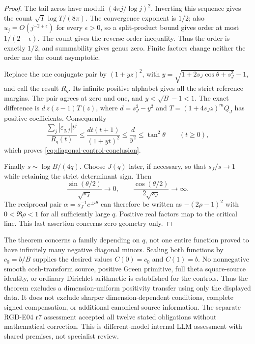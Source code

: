 \begin{proof}
The tail zeros have moduli $(4\pi j/\log j)^2$. Inverting this sequence
gives the count $\sqrt T\log T/(8\pi)$. The convergence exponent is
$1/2$; also $u_j=O(j^{-2+\epsilon})$ for every $\epsilon>0$, so a
split-product bound gives order at most $1/(2-\epsilon)$. The count
gives the reverse order inequality. Thus the order is exactly $1/2$,
and summability gives genus zero. Finite factors change neither the
order nor the count asymptotic.

Replace the one conjugate pair by $(1+yz)^2$, with
$y=\sqrt{1+2s_J\cos\theta+s_J^2}-1$, and call the result $R_q$.
Its infinite positive alphabet gives all the strict reference margins.
The pair agrees at zero and one, and $y<\sqrt B-1<1$.
The exact difference is $d\,z(z-1)T(z)$, where
$d=s_J^2-y^2$ and $T=(1+4s_Jz)^mQ_J$ has positive coefficients.
Consequently
\[
 \frac{\sum_j|\varepsilon_{q,j}|t^j}{R_q(t)}
 \le\frac{dt(t+1)}{(1+yt)^2}
 \le\frac d{y^2}\le\tan^2\theta\qquad(t\ge0),
\]
which proves \eqref{eq:diagonal-control-conclusion}.

Finally $s\sim\log B/(4q)$. Choose $J(q)$ later, if necessary, so
that $s_J/s\to1$ while retaining the strict determinant sign. Then
\[
 \frac{\sin(\theta/2)}{\sqrt{s_J}}\to0,
 \qquad \frac{\cos(\theta/2)}{2\sqrt{s_J}}\to\infty.
\]
The reciprocal pair $\alpha=s_J^{-1}e^{\pm i\theta}$ can therefore
be written as $-(2\rho-1)^2$ with $0<\Re\rho<1$ for all sufficiently
large $q$. Positive real factors map to the critical line. This last
assertion concerns zero geometry only.
\end{proof}

The theorem concerns a family depending on $q$, not one entire function
proved to have infinitely many negative diagonal minors. Scaling both
functions by $c_0=b/B$ supplies the desired values $C(0)=c_0$ and
$C(1)=b$. No nonnegative smooth cosh-transform source, positive Green
primitive, full theta square-source identity, or ordinary Dirichlet
arithmetic is established for the controls. Thus the theorem excludes
a dimension-uniform positivity transfer using only the displayed data.
It does not exclude sharper dimension-dependent conditions, complete
signed compensation, or additional canonical source information.
The separate RGD-E04 r7 assessment accepted all twelve stated
obligations without mathematical correction. This is different-model
internal LLM assessment with shared premises, not specialist review.
